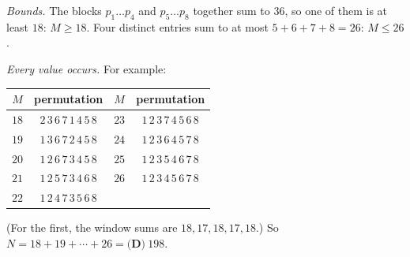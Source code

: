 \emph{Bounds.} The blocks $p_1\dots p_4$ and $p_5\dots p_8$ together sum to $36$, so one of them is at least $18$: $M\ge18$. Four distinct entries sum to at most $5+6+7+8=26$: $M\le26$.

\emph{Every value occurs.} For example:
\begin{center}
\begin{tabular}{cc|cc}
$M$ & permutation & $M$ & permutation\\\hline
$18$ & $2\,3\,6\,7\,1\,4\,5\,8$ & $23$ & $1\,2\,3\,7\,4\,5\,6\,8$\\
$19$ & $1\,3\,6\,7\,2\,4\,5\,8$ & $24$ & $1\,2\,3\,6\,4\,5\,7\,8$\\
$20$ & $1\,2\,6\,7\,3\,4\,5\,8$ & $25$ & $1\,2\,3\,5\,4\,6\,7\,8$\\
$21$ & $1\,2\,5\,7\,3\,4\,6\,8$ & $26$ & $1\,2\,3\,4\,5\,6\,7\,8$\\
$22$ & $1\,2\,4\,7\,3\,5\,6\,8$ & &
\end{tabular}
\end{center}
(For the first, the window sums are $18,17,18,17,18$.) So $N=18+19+\cdots+26=\boxed{\textbf{(D)}\ 198}$.
